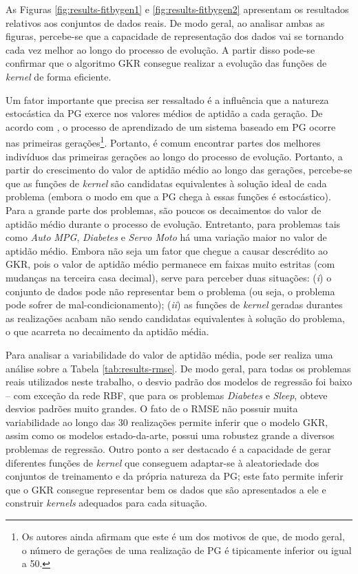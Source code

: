 As Figuras \ref{fig:results-fitbygen1} e \ref{fig:results-fitbygen2} apresentam os resultados relativos aos conjuntos de dados reais. De modo geral, ao analisar ambas as figuras, percebe-se que a capacidade de representação dos dados vai se tornando cada vez melhor ao longo do processo de evolução. A partir disso pode-se confirmar que o algoritmo GKR consegue realizar a evolução das funções de \textit{kernel} de forma eficiente.

Um fator importante que precisa ser ressaltado é a influência que a natureza estocástica da PG exerce nos valores médios de aptidão a cada geração. De acordo com , o processo de aprendizado de um sistema baseado em PG ocorre nas primeiras gerações\footnote{Os autores ainda afirmam que este é um dos motivos de que, de modo geral, o número de gerações de uma realização de PG é tipicamente inferior ou igual a 50.}. Portanto, é comum encontrar partes dos melhores indivíduos das primeiras gerações ao longo do processo de evolução. Portanto, a partir do crescimento do valor de aptidão médio ao longo das gerações, percebe-se que as funções de \textit{kernel} são candidatas equivalentes à solução ideal de cada problema (embora o modo em que a PG chega à essas funções é estocástico). Para a grande parte dos problemas, são poucos os decaimentos do valor de aptidão médio durante o processo de evolução. Entretanto, para problemas tais como \textit{Auto MPG}, \textit{Diabetes} e \textit{Servo Moto} há uma variação maior no valor de aptidão médio. Embora não seja um fator que chegue a causar descrédito ao GKR, pois o valor de aptidão médio permanece em faixas muito estritas (com mudanças na terceira casa decimal), serve para perceber duas situações: (\textit{i}) o conjunto de dados pode não representar bem o problema (ou seja, o problema pode sofrer de mal-condicionamento); (\textit{ii}) as funções de \textit{kernel} geradas durantes as realizações acabam não sendo candidatas equivalentes à solução do problema, o que acarreta no decaimento da aptidão média.

Para analisar a variabilidade do valor de aptidão média, pode ser realiza uma análise sobre a Tabela \ref{tab:results-rmse}. De modo geral, para todas os problemas reais utilizados neste trabalho, o desvio padrão dos modelos de regressão foi baixo -- com exceção da rede RBF, que para os problemas \textit{Diabetes} e \textit{Sleep}, obteve desvios padrões muito grandes. O fato de o RMSE não possuir muita variabilidade ao longo das 30 realizações permite inferir que o modelo GKR, assim como os modelos estado-da-arte, possui uma robustez grande a diversos problemas de regressão. Outro ponto a ser destacado é a capacidade de gerar diferentes funções de \textit{kernel} que conseguem adaptar-se à aleatoriedade dos conjuntos de treinamento e da própria natureza da PG; este fato permite inferir que o GKR consegue representar bem os dados que são apresentados a ele e construir \textit{kernels} adequados para cada situação.

